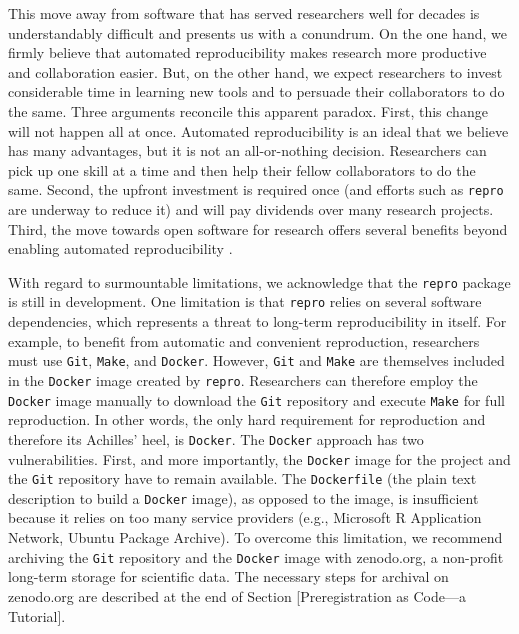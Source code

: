 \documentclass[psych,tutorial,accept,moreauthors,pdftex]{Definitions/mdpi}
\begin{document}
\begin{paracol}{2}
This move away from software that has served researchers well for
decades is understandably difficult and presents us with a conundrum. On
the one hand, we firmly believe that automated reproducibility makes
research more productive and collaboration easier. But, on the other
hand, we expect researchers to invest considerable time in learning new
tools and to persuade their collaborators to do the same. Three
arguments reconcile this apparent paradox. First, this change will not
happen all at once. Automated reproducibility is an ideal that we
believe has many advantages, but it is not an all-or-nothing decision.
Researchers can pick up one skill at a time and then help their fellow
collaborators to do the same. Second, the upfront investment is required
once (and efforts such as \texttt{repro} are underway to reduce it) and
will pay dividends over many research projects. Third, the move towards
open software for research offers several benefits beyond enabling
automated reproducibility
\citep{schaffnerFutureScientificJournals1994, fitzgeraldTransformationOpenSource2006, chaldecottHistoryScientificTechnical1965, sonnenburgNeedOpenSource2007}.

With regard to surmountable limitations, we acknowledge that the
\texttt{repro} package is still in development. One limitation is that
\texttt{repro} relies on several software dependencies, which represents
a threat to long-term reproducibility in itself. For example, to benefit
from automatic and convenient reproduction, researchers must use
\texttt{Git}, \texttt{Make}, and \texttt{Docker}. However, \texttt{Git}
and \texttt{Make} are themselves included in the \texttt{Docker} image
created by \texttt{repro}. Researchers can therefore employ the
\texttt{Docker} image manually to download the \texttt{Git} repository
and execute \texttt{Make} for full reproduction. In other words, the
only hard requirement for reproduction and therefore its Achilles' heel,
is \texttt{Docker}. The \texttt{Docker} approach has two
vulnerabilities. First, and more importantly, the \texttt{Docker} image
for the project and the \texttt{Git} repository have to remain
available. The \texttt{Dockerfile} (the plain text description to build
a \texttt{Docker} image), as opposed to the image, is insufficient
because it relies on too many service providers (e.g., Microsoft R
Application Network, Ubuntu Package Archive). To overcome this
limitation, we recommend archiving the \texttt{Git} repository and the
\texttt{Docker} image with zenodo.org, a non-profit long-term storage
for scientific data. The necessary steps for archival on zenodo.org are
described at the end of Section {[}Preregistration as Code---a
Tutorial{]}.


\end{paracol}
\end{document}
